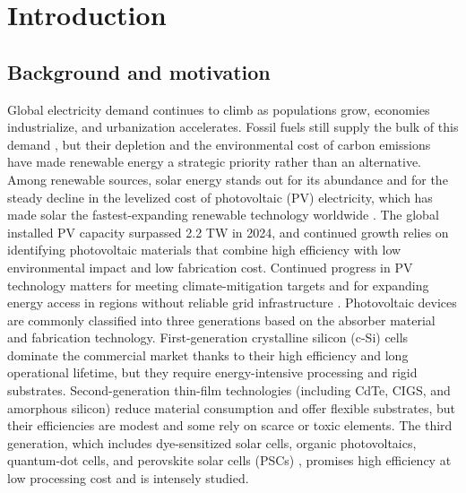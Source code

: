 \documentclass[review]{elsarticle}
\begin{document}
\section{Introduction}

\subsection{Background and motivation}
Global electricity demand continues to climb as populations grow, economies industrialize, and urbanization accelerates. Fossil fuels still supply the bulk of this demand \cite{r1,r2}, but their depletion and the environmental cost of carbon emissions have made renewable energy a strategic priority rather than an alternative. Among renewable sources, solar energy stands out for its abundance and for the steady decline in the levelized cost of photovoltaic (PV) electricity, which has made solar the fastest-expanding renewable technology worldwide \cite{r3}. The global installed PV capacity surpassed 2.2 TW in 2024, and continued growth relies on identifying photovoltaic materials that combine high efficiency with low environmental impact and low fabrication cost. Continued progress in PV technology matters for meeting climate-mitigation targets and for expanding energy access in regions without reliable grid infrastructure \cite{r4}. Photovoltaic devices are commonly classified into three generations based on the absorber material and fabrication technology. First-generation crystalline silicon (c-Si) cells dominate the commercial market thanks to their high efficiency and long operational lifetime, but they require energy-intensive processing and rigid substrates. Second-generation thin-film technologies (including CdTe, CIGS, and amorphous silicon) reduce material consumption and offer flexible substrates, but their efficiencies are modest and some rely on scarce or toxic elements. The third generation, which includes dye-sensitized solar cells, organic photovoltaics, quantum-dot cells, and perovskite solar cells (PSCs) \cite{r5,r6}, promises high efficiency at low processing cost and is intensely studied.
\end{document}
